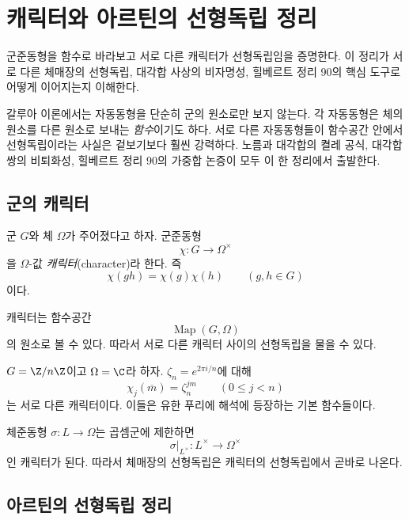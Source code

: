 \clearpage
\section{캐릭터와 아르틴의 선형독립 정리}
\label{sec:characters-independence}

\begin{learninggoal}
군준동형을 함수로 바라보고 서로 다른 캐릭터가 선형독립임을 증명한다. 이 정리가 서로 다른 체매장의 선형독립, 대각합 사상의 비자명성, 힐베르트 정리 90의 핵심 도구로 어떻게 이어지는지 이해한다.
\end{learninggoal}

갈루아 이론에서는 자동동형을 단순히 군의 원소로만 보지 않는다. 각 자동동형은 체의 원소를 다른 원소로 보내는 \emph{함수}이기도 하다. 서로 다른 자동동형들이 함수공간 안에서 선형독립이라는 사실은 겉보기보다 훨씬 강력하다. 노름과 대각합의 켤레 공식, 대각합 쌍의 비퇴화성, 힐베르트 정리 90의 가중합 논증이 모두 이 한 정리에서 출발한다.

\subsection{군의 캐릭터}

\begin{definition}[캐릭터]
군 $G$와 체 $\Omega$가 주어졌다고 하자. 군준동형
\[
  \chi:G\longrightarrow\Omega^\times
\]
을 $\Omega$-값 \emph{캐릭터}(character)라 한다. 즉
\[
  \chi(gh)=\chi(g)\chi(h)
  \qquad(g,h\in G)
\]
이다.
\end{definition}

캐릭터는 함수공간
\[
  \operatorname{Map}(G,\Omega)
\]
의 원소로 볼 수 있다. 따라서 서로 다른 캐릭터 사이의 선형독립을 물을 수 있다.

\begin{example}
$G=\Z/n\Z$이고 $\Omega=\C$라 하자. $\zeta_n=e^{2\pi i/n}$에 대해
\[
  \chi_j(\overline m)=\zeta_n^{jm}
  \qquad(0\le j<n)
\]
는 서로 다른 캐릭터이다. 이들은 유한 푸리에 해석에 등장하는 기본 함수들이다.
\end{example}

\begin{example}
체준동형 $\sigma:L\to\Omega$는 곱셈군에 제한하면
\[
  \sigma|_{L^\times}:L^\times\longrightarrow\Omega^\times
\]
인 캐릭터가 된다. 따라서 체매장의 선형독립은 캐릭터의 선형독립에서 곧바로 나온다.
\end{example}

\subsection{아르틴의 선형독립 정리}

